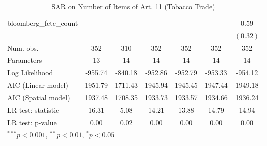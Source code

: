 \begin{table}[!h]
\begin{center}
\begin{tabular}{l c c c c c c }
bloomberg\_fctc\_count  &              &              &              &              &              & $0.59$       \\
                        &              &              &              &              &              & $(0.32)$     \\
\midrule
Num. obs.               & 352          & 310          & 352          & 352          & 352          & 352          \\
Parameters              & 13           & 14           & 14           & 14           & 14           & 14           \\
Log Likelihood          & -955.74      & -840.18      & -952.86      & -952.79      & -953.33      & -954.12      \\
AIC (Linear model)      & 1951.79      & 1711.43      & 1945.94      & 1945.45      & 1947.44      & 1949.18      \\
AIC (Spatial model)     & 1937.48      & 1708.35      & 1933.73      & 1933.57      & 1934.66      & 1936.24      \\
LR test: statistic      & 16.31        & 5.08         & 14.21        & 13.88        & 14.79        & 14.94        \\
LR test: p-value        & 0.00         & 0.02         & 0.00         & 0.00         & 0.00         & 0.00         \\
\bottomrule
\multicolumn{7}{l}{\scriptsize{$^{***}p<0.001$, $^{**}p<0.01$, $^*p<0.05$}}
\end{tabular}
\caption{SAR on Number of Items of Art. 11 (Tobacco Trade)}
\label{table:coefficients}
\end{center}
\end{table}
